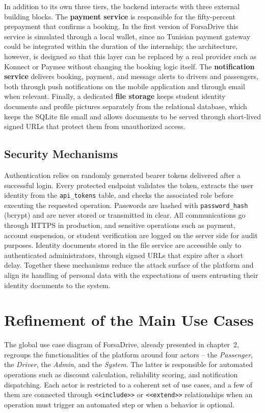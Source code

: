 In addition to its own three tiers, the backend interacts with three external building blocks. The \textbf{payment service} is responsible for the fifty-percent prepayment that confirms a booking. In the first version of ForsaDrive this service is simulated through a local wallet, since no Tunisian payment gateway could be integrated within the duration of the internship; the architecture, however, is designed so that this layer can be replaced by a real provider such as Konnect or Paymee without changing the booking logic itself. The \textbf{notification service} delivers booking, payment, and message alerts to drivers and passengers, both through push notifications on the mobile application and through email when relevant. Finally, a dedicated \textbf{file storage} keeps student identity documents and profile pictures separately from the relational database, which keeps the SQLite file small and allows documents to be served through short-lived signed URLs that protect them from unauthorized access.

\subsection{Security Mechanisms}

Authentication relies on randomly generated bearer tokens delivered after a successful login. Every protected endpoint validates the token, extracts the user identity from the \texttt{api\_tokens} table, and checks the associated role before executing the requested operation. Passwords are hashed with \texttt{password\_hash} (bcrypt) and are never stored or transmitted in clear. All communications go through HTTPS in production, and sensitive operations such as payment, account suspension, or student verification are logged on the server side for audit purposes. Identity documents stored in the file service are accessible only to authenticated administrators, through signed URLs that expire after a short delay. Together these mechanisms reduce the attack surface of the platform and align its handling of personal data with the expectations of users entrusting their identity documents to the system.

\section{Refinement of the Main Use Cases}

The global use case diagram of ForsaDrive, already presented in chapter~2, regroups the functionalities of the platform around four actors -- the \textit{Passenger}, the \textit{Driver}, the \textit{Admin}, and the \textit{System}. The latter is responsible for automated operations such as discount calculation, reliability scoring, and notification dispatching. Each actor is restricted to a coherent set of use cases, and a few of them are connected through \texttt{<<include>>} or \texttt{<<extend>>} relationships when an operation must trigger an automated step or when a behavior is optional.

